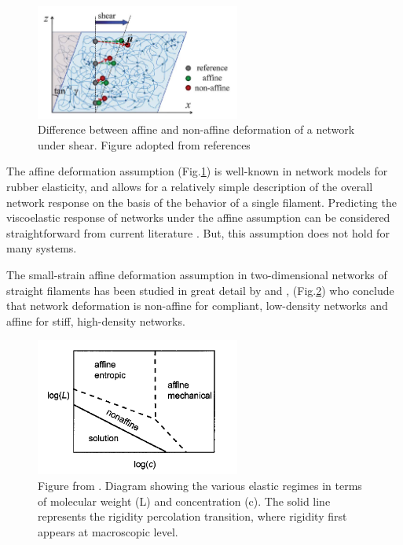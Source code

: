  \begin{figure}[ht]
\begin{center}
\includegraphics[width=0.6\textwidth]{Figures/chapter-intro/nonaffine.png}%

\caption[Affine and non-affine deformations]{ Difference between affine
and non-affine deformation of a network under shear. Figure adopted from
references \citep{wen_non-affine_2012,basu_nonaffine_2011}
}
\label{fig:nonaffine}
\end{center}
\end{figure}
The affine deformation assumption (Fig.\ref{fig:nonaffine}) is well-known in
network models for rubber elasticity, and allows for a relatively
simple description of the overall network response on the basis of the behavior
of a single filament. Predicting the viscoelastic response of networks under the affine assumption can be considered straightforward from current literature \cite{rizzi_importance_2016}.
But, this assumption does not hold for many systems.

The small-strain affine deformation assumption in two-dimensional
networks of straight filaments has
been studied in great detail by \citet{head_distinct_2003,head_mechanical_2005}
and \citet{wilhelm_elasticity_2003}, (Fig.\ref{fig:nonaffine-head}) who conclude
that network deformation is non-affine for compliant, low-density networks
and affine for stiff, high-density networks.
 \begin{figure}[ht]
\begin{center}
\includegraphics[width=0.6\textwidth]{Figures/chapter-intro/nonaffine-head.png}%

\caption[Affine and non-affine phases]{ Figure from
\citet{head_mechanical_2005}. Diagram showing the various elastic regimes in
terms of molecular weight (L) and concentration (c). The solid line represents
the rigidity percolation transition, where rigidity first appears at
macroscopic level.}
\label{fig:nonaffine-head}
\end{center}
\end{figure}

